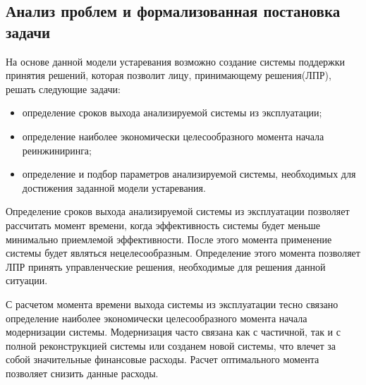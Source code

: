 
\subsection{Анализ проблем и формализованная постановка задачи}
На основе данной модели устаревания возможно создание системы поддержки принятия решений, которая позволит лицу, принимающему решения(ЛПР), решать следующие задачи:
\begin{itemize}
    \item определение сроков выхода анализируемой системы из эксплуатации;
    \item определение наиболее экономически целесообразного момента начала реинжиниринга;
    \item определение и подбор параметров анализируемой системы, необходимых для достижения заданной модели устаревания.
\end{itemize}

Определение сроков выхода анализируемой системы из эксплуатации позволяет рассчитать момент времени, когда эффективность системы будет меньше минимально приемлемой эффективности. 
После этого момента применение системы будет являться нецелесообразным. Определение этого момента позволяет ЛПР принять управленческие решения, необходимые для решения данной ситуации.

С расчетом момента времени выхода системы из эксплуатации тесно связано определение наиболее экономически целесообразного момента начала модернизации системы. 
Модернизация часто связана как с частичной, так и с полной реконструкцией системы или созданем новой системы, что влечет за собой значительные финансовые расходы. 
Расчет оптимального момента позволяет снизить данные расходы.

